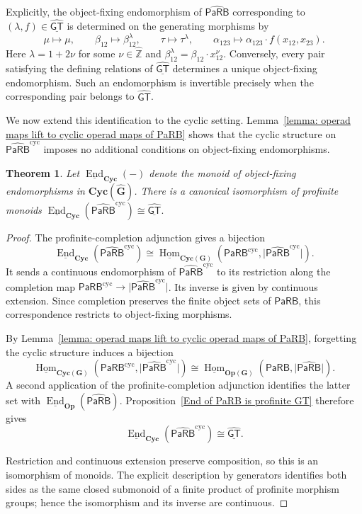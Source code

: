 \documentclass{amsart}
\newcommand{\Grpd}{\mathbf{G}}
\newcommand{\PaRB}{\mathsf{PaRB}}
\newcommand{\Cyc}{\mathbf{Cyc}}
\newcommand{\Op}{\mathbf{Op}}
\newcommand{\End}{\operatorname{End}}
\newcommand{\Hom}{\operatorname{Hom}}
\newcommand{\GT}{\widehat{\mathsf{GT}}}
\newtheorem{thm}[theorem]{Theorem}%
\theoremstyle{definition}
\numberwithin{equation}{section}
\begin{document}
Explicitly, the object-fixing endomorphism of
$\widehat{\PaRB}$ corresponding to
$(\lambda,f)\in\underline{\GT}$ is determined on the generating
morphisms by
\[
\mu\longmapsto\mu,\qquad
\beta_{12}\longmapsto\beta_{12}^{\lambda},\qquad
\tau\longmapsto\tau^{\lambda},\qquad
\alpha_{123}\longmapsto
\alpha_{123}\cdot f(x_{12},x_{23}).
\]
Here $\lambda=1+2\nu$ for some $\nu\in\widehat{\mathbb Z}$ and $\beta_{12}^{\lambda} =\beta_{12}\cdot x_{12}^{\nu}$. Conversely, every pair satisfying the defining relations of $\underline{\GT}$ determines a unique object-fixing endomorphism. Such an endomorphism is invertible precisely when
the corresponding pair belongs to $\GT$.

We now extend this identification to the cyclic setting.
Lemma~\ref{lemma: operad maps lift to cyclic operad maps of PaRB}
shows that the cyclic structure on
$\widehat{\PaRB}^{\mathrm{cyc}}$ imposes no additional conditions
on object-fixing endomorphisms.

\begin{thm}
\label{thm: GT monoid iso to cyclic endomorphisms}
Let $\underline{\End}_{\Cyc}(-)$ denote the monoid of object-fixing
endomorphisms in $\Cyc(\widehat{\Grpd})$. There is a canonical
isomorphism of profinite monoids $\underline{\End}_{\Cyc}(\widehat{\PaRB}^{\mathrm{cyc}}) \cong
\underline{\GT}.$ 
\end{thm}

\begin{proof}
The profinite-completion adjunction gives a bijection
\[
\underline{\End}_{\Cyc}(\widehat{\PaRB}^{\mathrm{cyc}})\cong\underline{\Hom}_{\Cyc(\Grpd)}\left(\PaRB^{\mathrm{cyc}},\lvert\widehat{\PaRB}^{\mathrm{cyc}}\rvert\right).
\]
It sends a continuous endomorphism of $\widehat{\PaRB}^{\mathrm{cyc}}$ to its restriction along the completion map $\PaRB^{\mathrm{cyc}}\to \lvert\widehat{\PaRB}^{\mathrm{cyc}}\rvert$. Its inverse is given by continuous extension. Since completion preserves the finite object sets of $\PaRB$, this correspondence restricts to object-fixing morphisms.

By
Lemma~\ref{lemma: operad maps lift to cyclic operad maps of PaRB},
forgetting the cyclic structure induces a bijection
\[
\underline{\Hom}_{\Cyc(\Grpd)}
\left(
\PaRB^{\mathrm{cyc}},
\lvert\widehat{\PaRB}^{\mathrm{cyc}}\rvert
\right)
\cong
\underline{\Hom}_{\Op(\Grpd)}
\left(
\PaRB,
\lvert\widehat{\PaRB}\rvert
\right).
\]
A second application of the profinite-completion adjunction identifies the latter set with
$\underline{\End}_{\Op}(\widehat{\PaRB})$. Proposition~\ref{End of PaRB is profinite GT} therefore gives
\[
\underline{\End}_{\Cyc}(\widehat{\PaRB}^{\mathrm{cyc}})\cong \underline{\GT}.
\]

Restriction and continuous extension preserve composition, so this is an isomorphism of monoids. The explicit description by
generators identifies both sides as the same closed submonoid of a finite product of profinite morphism groups; hence the isomorphism and its inverse are continuous.
\end{proof}
\end{document}
